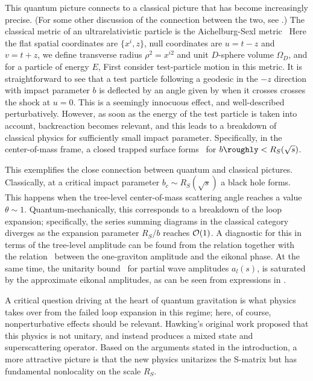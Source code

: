 This quantum picture connects to a classical picture that has become increasingly precise.  (For some other discussion of the connection between the two, see .)  The classical metric of an ultrarelativistic particle is the Aichelburg-Sexl metric~
%
\eqn{}
%
Here the flat spatial coordinates are $\{x^i, z\}$, null coordinates are $u=t-z$ and $v=t+z$, we define transverse radius $\rho^2=x^{i2}$ and unit $D$-sphere volume $\Omega_D$, and for a particle of energy $E$,
%
\eqn{}
%
First consider test-particle motion in this metric.  It is straightforward to see that a test particle following a geodesic in the $-z$ direction with impact parameter $b$ is deflected by an angle given by
%
\eqn{}
%
when it crosses crosses the shock at $u=0$.  This is a seemingly innocuous effect, and well-described perturbatively.  However, as soon as the energy of the test particle is taken into account, backreaction becomes relevant, and this leads to a breakdown of classical physics for sufficiently small impact parameter.  Specifically, in the center-of-mass frame, a closed trapped surface forms~ for $b\roughly<R_S(\sqrt s)$.  

This exemplifies the close connection between quantum and classical pictures.  Classically, at a critical impact parameter $b_c\sim R_S(\sqrt s)$ a black hole forms.  This happens when the tree-level center-of-mass scattering angle reaches a value $\theta\sim 1$.  Quantum-mechanically, this corresponds to a breakdown of the loop expansion; specifically, the series summing diagrams in the classical category diverges as the expansion parameter $R_S/b$ reaches ${\cal O}(1)$.  A diagnostic for this in terms of the tree-level amplitude can be found from the relation
%
\eqn{}
%
together with the relation \eiktree\ between the one-graviton amplitude and the eikonal phase.
At the same time, the unitarity bound~ for partial wave amplitudes $a_l(s)$,
%
\eqn{}
%
is saturated by the approximate eikonal amplitudes, as can be seen from expressions in .

A critical question driving at the heart of quantum gravitation is what physics takes over from the failed loop expansion in this regime; here, of course, nonperturbative effects should be relevant.  Hawking's original work  proposed that this physics is not unitary, and instead produces a mixed state and superscattering operator.  Based on the arguments stated in the introduction, a more attractive picture is that the new physics unitarizes the S-matrix but has fundamental nonlocality on the scale $R_S$.  

